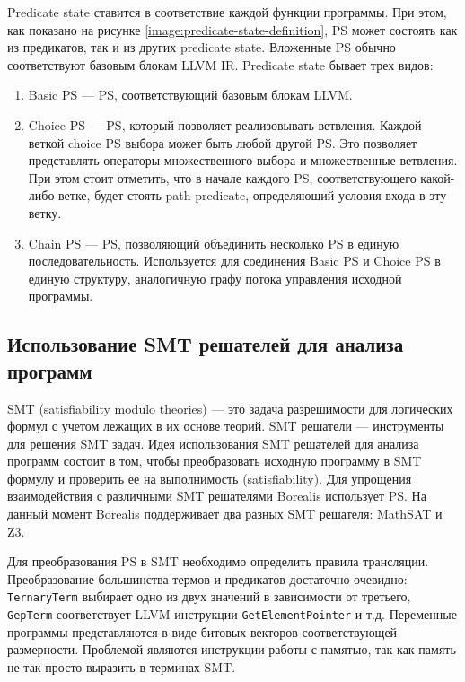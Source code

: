 Predicate state ставится в соответствие каждой функции программы. При этом, как показано на рисунке \ref{image:predicate-state-definition}, PS может состоять как из предикатов, так и из других predicate state. Вложенные PS обычно соответствуют базовым блокам LLVM IR. Predicate state бывает трех видов:
\begin{enumerate}
\item Basic PS --- PS, соответствующий базовым блокам LLVM.
\item Choice PS --- PS, который позволяет реализовывать ветвления. Каждой веткой choice PS выбора может быть любой другой PS. Это позволяет представлять операторы множественного выбора и множественные ветвления. При этом стоит отметить, что в начале каждого PS, соответствующего какой-либо ветке, будет стоять path predicate, определяющий условия входа в эту ветку.
\item Chain PS --- PS, позволяющий объединить несколько PS в единую последовательность. Используется для соединения Basic PS и Choice PS в единую структуру, аналогичную графу потока управления исходной программы.
\end{enumerate}

\subsection{Использование SMT решателей для анализа программ}
SMT (satisfiability modulo theories) --- это задача разрешимости для логических формул с учетом лежащих в их основе теорий\cite{smt}. SMT решатели --- инструменты для решения SMT задач. Идея использования SMT решателей для анализа программ состоит в том, чтобы преобразовать исходную программу в SMT формулу и проверить ее на выполнимость (satisfiability). Для упрощения взаимодействия с различными SMT решателями Borealis использует PS. На данный момент Borealis поддерживает два разных SMT решателя: MathSAT\cite{mathsatsolver} и Z3\cite{z3solver}. 

Для преобразования PS в SMT необходимо определить правила трансляции. Преобразование большинства термов и предикатов достаточно очевидно: \texttt{TernaryTerm} выбирает одно из двух значений в зависимости от третьего, \texttt{GepTerm} соответствует LLVM инструкции \texttt{GetElementPointer} и т.д. Переменные программы представляются в виде битовых векторов соответствующей размерности. Проблемой являются инструкции работы с памятью, так как память не так просто выразить в терминах SMT.

